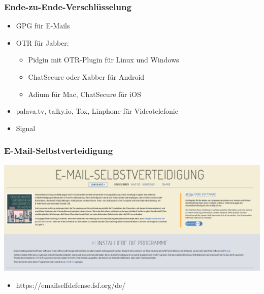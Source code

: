 \documentclass[12pt]{beamer}
\begin{document}
\begin{frame}
  \frametitle{Ende-zu-Ende-Verschlüsselung}
  \begin{itemize}
    \item<1-> GPG für E-Mails
    \item<2-> OTR für Jabber:
      \begin{itemize}
        \item Pidgin mit OTR-Plugin für Linux und Windows
        \item ChatSecure oder Xabber für Android
        \item Adium für Mac, ChatSecure für iOS
      \end{itemize}
    \item<3-> palava.tv, talky.io, Tox, Linphone für Videotelefonie
    \item<4-> Signal
  \end{itemize}
\end{frame}

\begin{frame}
  \frametitle{E-Mail-Selbstverteidigung}
  \begin{center}
    \includegraphics[height=0.5\textheight]{img/emailselfdefense.png}
    \begin{itemize}
      \item https://emailselfdefense.fsf.org/de/
    \end{itemize}
  \end{center}
\end{frame}
\end{document}
